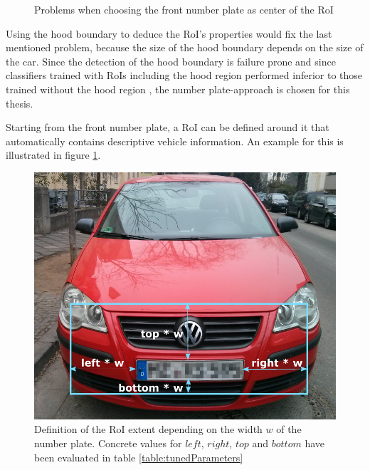 \begin{figure}[btph]
        \myfloatalign
         \quad
         \quad
        \caption[Problems when choosing the front number plate as center of the RoI]{Problems when choosing the front number plate as center of the RoI}
\end{figure}
Using the hood boundary to deduce the RoI's properties would fix the last mentioned problem, because the size of the hood boundary depends on the size of the car. Since the detection of the hood boundary is failure prone and since classifiers trained with RoIs including the hood region performed inferior to those trained without the hood region \citep{hsieh2014symmetrical}, the number plate-approach is chosen for this thesis.

Starting from the front number plate, a RoI can be defined around it that automatically contains descriptive vehicle information. An example for this is illustrated in figure \ref{fig:roiDimensions}.

\begin{figure}[btph]
  \centering
        \includegraphics[width=.35\linewidth]{gfx/roi_dimensions}
        \caption{Definition of the RoI extent depending on the width $w$ of the number plate. Concrete values for $left$, $right$, $top$ and $bottom$ have been evaluated in table \ref{table:tunedParameters}}
        \label{fig:roiDimensions}
\end{figure}


